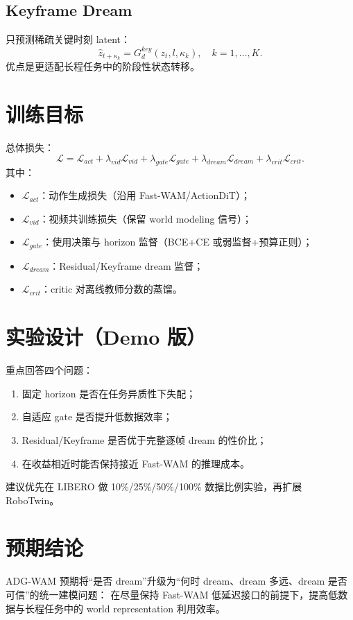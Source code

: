 \documentclass[11pt]{article}
\begin{document}
\subsection{Keyframe Dream}
只预测稀疏关键时刻 latent：
\begin{equation}
\hat z_{t+\kappa_k}=G_d^{key}(z_t,l,\kappa_k),\quad k=1,\dots,K.
\end{equation}
优点是更适配长程任务中的阶段性状态转移。

\section{训练目标}
总体损失：
\begin{equation}
\mathcal L = \mathcal L_{act} + \lambda_{vid}\mathcal L_{vid} + \lambda_{gate}\mathcal L_{gate}
+ \lambda_{dream}\mathcal L_{dream} + \lambda_{crit}\mathcal L_{crit}.
\end{equation}
其中：
\begin{itemize}
  \item $\mathcal L_{act}$：动作生成损失（沿用 Fast-WAM/ActionDiT）；
  \item $\mathcal L_{vid}$：视频共训练损失（保留 world modeling 信号）；
  \item $\mathcal L_{gate}$：使用决策与 horizon 监督（BCE+CE 或弱监督+预算正则）；
  \item $\mathcal L_{dream}$：Residual/Keyframe dream 监督；
  \item $\mathcal L_{crit}$：critic 对离线教师分数的蒸馏。
\end{itemize}

\section{实验设计（Demo 版）}
重点回答四个问题：
\begin{enumerate}
  \item 固定 horizon 是否在任务异质性下失配；
  \item 自适应 gate 是否提升低数据效率；
  \item Residual/Keyframe 是否优于完整逐帧 dream 的性价比；
  \item 在收益相近时能否保持接近 Fast-WAM 的推理成本。
\end{enumerate}
建议优先在 LIBERO 做 10\%/25\%/50\%/100\% 数据比例实验，再扩展 RoboTwin。

\section{预期结论}
ADG-WAM 预期将“是否 dream”升级为“何时 dream、dream 多远、dream 是否可信”的统一建模问题：
在尽量保持 Fast-WAM 低延迟接口的前提下，提高低数据与长程任务中的 world representation 利用效率。
\end{document}
